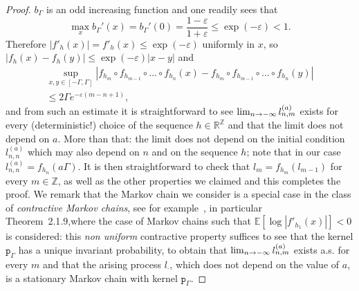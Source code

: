 \documentclass[10pt]{amsart}
\theoremstyle{definition}\newtheorem{defi}[theo]{Definition}\newtheorem{rema}[theo]{Remark}\newtheorem{exam}[theo]{Example}\newtheorem{exem}[theo]{Example}\newtheorem{nota}[theo]{Notation}
\newcommand{\pp}{\mathtt{p}_\gG}
\newcommand{\bbE}{\mathbb{E}}
\newcommand{\bbR}{\mathbb{R}}
\newcommand{\bbZ}{\mathbb{Z}}
\newcommand{\gep}{\varepsilon}
\newcommand{\gG}{\Gamma}
\renewcommand*{\to}{\mathchoice{\longrightarrow}{\rightarrow}{\rightarrow}{\rightarrow}}
\begin{document}
\begin{proof}
$b_\gG$ is an odd increasing function and one readily sees that
\begin{equation}
\max_x b_\gG' (x)= b_\gG' (0)= \frac{1-\gep}{1+ \gep}\le \exp(-\gep) <1.
\end{equation}
Therefore $| f'_h(x)|= f'_h(x)\!\le\! \exp(-\gep)$ uniformly in $x$, so $| f_h(x)-f_h(y)| \!\le\! \exp(-\gep) | x-y |$ and
\begin{multline}\label{eq:17JLct}
\sup_{x, y \in [-\gG, \gG]}
\left|f_{h_{m}} \circ f_{h_{m-1}} \circ \dots \circ f_{h_n} \left(x\right)- f_{h_{m}} \circ f_{h_{m-1}} \circ \dots \circ f_{h_n} (y)\right|\\
\le 2 \gG e^{-\gep (m-n+1)},
\end{multline}
and from such an estimate it is straightforward to see $\lim_{n \to -\infty} l^{(a)}_{n, m}$ exists for every (deterministic!) choice of the sequence $h\in \bbR^\bbZ$ and that the limit does not depend on $a$. More than that: the limit does not depend on the initial condition $l^{(a)}_{n, n}$ which may also depend on $n$ and on the sequence $h$; note that in our case $l^{(a)}_{n, n}=f_{h_n}(a \gG)$. It is then straightforward to check that $l_{m}=f_{h_m}(l_{m-1})$ for every $m\in\bbZ$, as well as the other properties we claimed and this completes the proof. We remark that the Markov chain we consider is a special case in the class of \emph{contractive Markov chains}, see for example~\cite[Chapter~2]{cf:MC}, in particular Theorem~2.1.9,\linebreak where the case of Markov chains such that $\bbE[\log |f'_{h_1}(x)|] <0$ is considered: this \emph{non uniform} contractive property suffices to see that the kernel $\pp$ has a unique invariant probability, to obtain that $\lim_{n \to -\infty} l^{(a)}_{n, m}$ exists a.s. for every $m$ and that the arising process $l_\cdot$, which does not depend on the value of $a$, is a stationary Markov chain with kernel $\pp$.
\end{proof}
\end{document}

